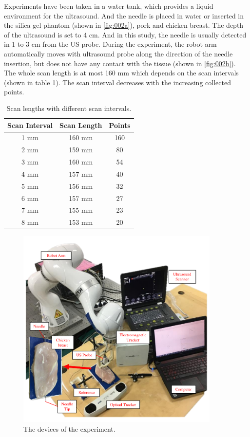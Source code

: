 \documentclass[journal,article,submit,moreauthors,pdftex]{Definitions/mdpi}
\begin{document}
Experiments have been taken in a water tank, which provides a liquid environment for the ultrasound.
And the needle is placed in water or inserted in the silica gel phantom (shown in \ref{fig:002a}), pork and chicken breast.
The depth of the ultrasound is set to 4 cm.
And in this study, the needle is usually detected in 1 to 3 cm from the US probe.
During the experiment, the robot arm automatically moves with ultrasound probe along the direction of the needle insertion, but does not have any contact with the tissue (shown in \ref{fig:002b}).
The whole scan length is at most 160 mm which depends on the scan intervals (shown in table 1). The scan interval decreases with the increasing collected points.

\begin{table}[H]
\caption{Scan lengths with different scan intervals.}
\centering
\begin{tabular}{ccc}
\rowcolor{gray!40}\textbf{Scan Interval}  & \textbf{Scan Length}  & \textbf{Points}\\
\hline 1 mm    & 160 mm    & 160\\
\hline 2 mm    & 159 mm    & 80\\
\hline 3 mm    & 160 mm    & 54\\
\hline 4 mm    & 157 mm    & 40\\
\hline 5 mm    & 156 mm    & 32\\
\hline 6 mm    & 157 mm    & 27\\
\hline 7 mm    & 155 mm    & 23\\
\hline 8 mm    & 153 mm    & 20\\
\bottomrule
\end{tabular}
\end{table}

\begin{figure}[H]
\centering
\includegraphics[width=0.9\textwidth]{figures/2/f6.pdf}
\captionsetup{width=16 cm,justification=centering}
\caption{The devices of the experiment.}
\label{fig:6}
\end{figure}
\end{document}
